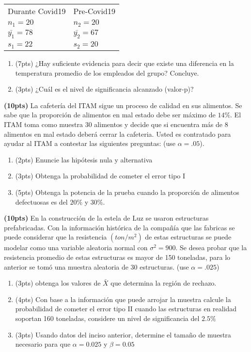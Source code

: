 \documentclass[addpoints]{exam}
\theoremstyle{mytheor}
\begin{document}
\begin{questions}
    \begin{table}[h]
    \centering
    \begin{tabular}{ll}
    Durante Covid19 & Pre-Covid19 \\
    $n_1 = 20$ & $n_2 = 20$ \\
    $\bar{y_1} =  78$ & $\bar{y_2} = 67$ \\
    $s_1 = 22$ &  $s_2 = 20$
    \end{tabular}
    \end{table}

\begin{enumerate}[label=\Alph*)]
  \item (7pts) ¿Hay suficiente evidencia para decir que existe una diferencia en la temperatura promedio de los empleados del grupo? Concluye.
  \item (3pts) ¿Cuál es el nivel de significancia alcanzado (valor-p)?
  \end{enumerate}
  
  \question \textbf{(10pts)} La cafetería del ITAM sigue un proceso de calidad en sus alimentos. Se sabe que la proporción de alimentos en mal estado debe ser máximo de $14\%$. El ITAM toma como muestra 30 alimentos y decide que si encuentra más de 8 alimentos en mal estado deberá cerrar la cafeteria. Usted es contratado para ayudar al ITAM a contestar las siguientes preguntas: (use $\alpha = .05$). 
  
  \begin{enumerate}[label=\Alph*)]
  \item (2pts) Enuncie las hipótesis nula y alternativa
  \item (3pts) Obtenga la probabilidad de cometer el error tipo I 
  \item (5pts) Obtenga la potencia de la prueba cuando la proporción de alimentos defectuosas es del $20\%$ y $30\%$. 

  \end{enumerate}
 
  
  \question \textbf{(10pts)} En la construcción de la estela de Luz se usaron estructuras prefabricadas. Con la información histórica de la compañía que las fabricas se puede considerar que la resistencia $(ton/m^2)$ de estas estructuras se puede modelar como una variable aleatoria normal con $\sigma^2 = 900$. Se desea probar que la resistencia promedio de estas estructuras es mayor de 150 toneladas, para lo anterior se tomó una muestra aleatoria de 30 estructuras. (use $\alpha = .025$) 
  \begin{enumerate}[label=\Alph*)]
  \item (3pts) obtenga los valores de $\bar{X}$ que determina la región de rechazo. 
  \item (4pts) Con base a la información que puede arrojar la muestra calcule la probabilidad de cometer el error tipo II cuando las estructuras en realidad soportan 160 toneladas, considere un nivel de significancia del $2.5\%$
  \item (3pts) Usando datos del inciso anterior, determine el tamaño de muestra necesario para que $\alpha = 0.025$ y $\beta = 0.05$
  \end{enumerate}

  \end{questions}
  
\end{document}
